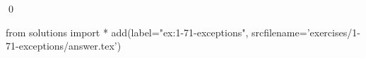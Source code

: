 
\begin{ex}
  \label{ex:1-71-exceptions}
  
  \qed
\end{ex}
\begin{python0}
from solutions import *
add(label="ex:1-71-exceptions",
    srcfilename='exercises/1-71-exceptions/answer.tex')
\end{python0}
